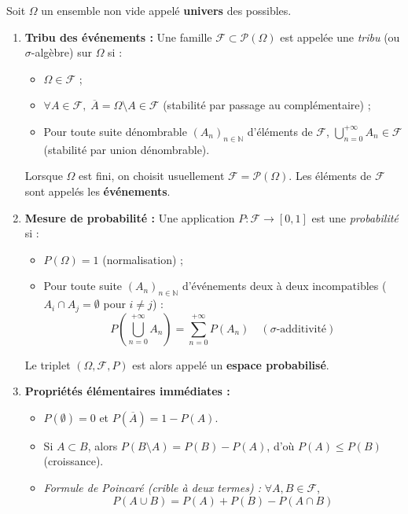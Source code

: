 \documentclass[11pt,a4paper]{article}
\newcommand{\N}{\mathbb{N}}
\begin{document}
\begin{coursbox}
Soit $\Omega$ un ensemble non vide appelé \textbf{univers} des possibles.
\begin{enumerate}
    \item \textbf{Tribu des événements :} Une famille $\mathscr{F} \subset \mathscr{P}(\Omega)$ est appelée une \emph{tribu} (ou $\sigma$-algèbre) sur $\Omega$ si :
    \begin{itemize}[label=$\bullet$]
        \item $\Omega \in \mathscr{F}$ ;
        \item $\forall A \in \mathscr{F}, \; \overline{A} = \Omega \setminus A \in \mathscr{F}$ (stabilité par passage au complémentaire) ;
        \item Pour toute suite dénombrable $(A_n)_{n \in \N}$ d'éléments de $\mathscr{F}$, $\bigcup_{n=0}^{+\infty} A_n \in \mathscr{F}$ (stabilité par union dénombrable).
    \end{itemize}
    Lorsque $\Omega$ est fini, on choisit usuellement $\mathscr{F} = \mathscr{P}(\Omega)$. Les éléments de $\mathscr{F}$ sont appelés les \textbf{événements}.

    \item \textbf{Mesure de probabilité :} Une application $P : \mathscr{F} \to [0, 1]$ est une \emph{probabilité} si :
    \begin{itemize}[label=$\bullet$]
        \item $P(\Omega) = 1$ (normalisation) ;
        \item Pour toute suite $(A_n)_{n \in \N}$ d'événements deux à deux incompatibles ($A_i \cap A_j = \emptyset$ pour $i \neq j$) :
        \[
        P\left(\bigcup_{n=0}^{+\infty} A_n\right) = \sum_{n=0}^{+\infty} P(A_n) \quad (\sigma\text{-additivité})
        \]
    \end{itemize}
    Le triplet $(\Omega, \mathscr{F}, P)$ est alors appelé un \textbf{espace probabilisé}.

    \item \textbf{Propriétés élémentaires immédiates :}
    \begin{itemize}[label=$\bullet$]
        \item $P(\emptyset) = 0$ et $P(\overline{A}) = 1 - P(A)$.
        \item Si $A \subset B$, alors $P(B \setminus A) = P(B) - P(A)$, d'où $P(A) \le P(B)$ (croissance).
        \item \emph{Formule de Poincaré (crible à deux termes) :} $\forall A, B \in \mathscr{F}$,
        \[
        P(A \cup B) = P(A) + P(B) - P(A \cap B)
        \]
    \end{itemize}
\end{enumerate}
\end{coursbox}
\end{document}
